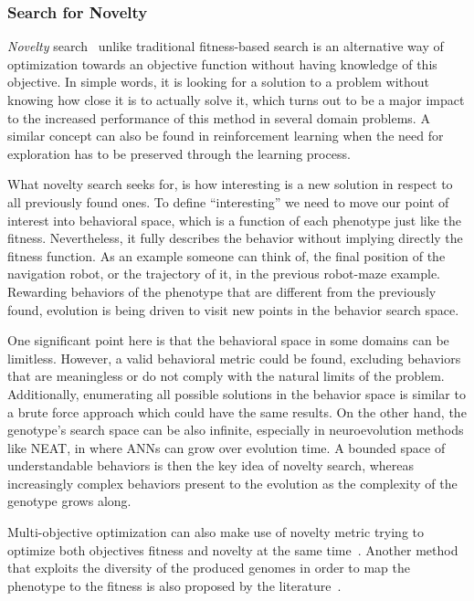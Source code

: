 \subsubsection*{Search for Novelty}

\emph{Novelty} search~\cite{lehman2008exploiting,lehman2011abandoning,lehman2010revising, risi2009novelty} unlike traditional fitness-based search is an alternative way of optimization towards an objective function without having knowledge of this objective. In simple words, it is looking for a solution to a problem without knowing how close it is to actually solve it, which turns out to be a major impact to the increased performance of this method in several domain problems. A similar concept can also be found in reinforcement learning when the need for exploration has to be preserved through the learning process.

What novelty search seeks for, is how interesting is a new solution in respect to all previously found ones. To define ``interesting'' we need to move our point of interest into behavioral space, which is a function of each phenotype just like the fitness. Nevertheless, it fully describes the behavior without implying directly the fitness function. As an example someone can think of, the final position of the navigation robot, or the trajectory of it, in the previous robot-maze example. Rewarding behaviors of the phenotype that are different from the previously found, evolution is being driven to visit new points in the behavior search space.

One significant point here is that the behavioral space in some domains can be limitless. However, a valid behavioral metric could be found, excluding behaviors that are meaningless or do not comply with the natural limits of the problem. Additionally, enumerating all possible solutions in the behavior space is similar to a brute force approach which could have the same results. On the other hand, the genotype's search space can be also infinite, especially in neuroevolution methods like NEAT, in where ANNs can grow over evolution time. A bounded space of understandable behaviors is then the key idea of novelty search, whereas increasingly complex behaviors present to the evolution as the complexity of the genotype grows along.

Multi-objective optimization can also make use of novelty metric trying to optimize both objectives fitness and novelty at the same time~\cite{mouret2011novelty}. Another method that exploits the diversity of the produced genomes in order to map the phenotype to the fitness is also proposed by the literature~\cite{mouret2012algorithm}.

